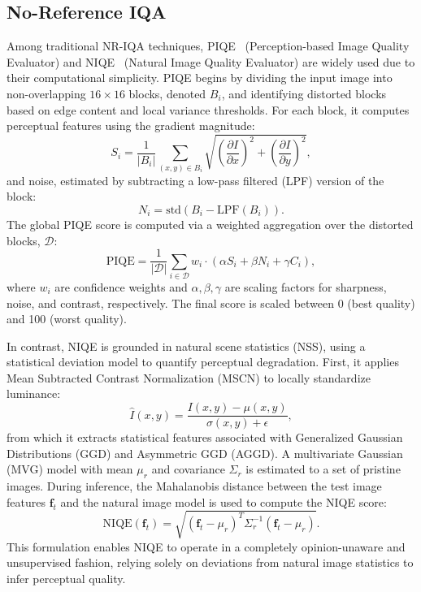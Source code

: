 \subsection{No-Reference IQA}\label{sec:no_reference_iqa}

Among traditional NR-IQA techniques, PIQE~\cite{piqe2016} (Perception-based Image Quality Evaluator) and NIQE~\cite{mittal2013making} (Natural Image Quality Evaluator) are widely used due to their computational simplicity. PIQE begins by dividing the input image into non-overlapping $16 \times 16$ blocks, denoted $B_i$, and identifying distorted blocks based on edge content and local variance thresholds. For each block, it computes perceptual features using the gradient magnitude:
\begin{equation}
S_i = \frac{1}{|B_i|} \sum_{(x,y) \in B_i} \sqrt{ {\left( \frac{\partial I}{\partial x} \right)}^2 + {\left( \frac{\partial I}{\partial y} \right)}^2 },
\end{equation}
and noise, estimated by subtracting a low-pass filtered (LPF) version of the block:
\begin{equation}
N_i = \text{std}\left( B_i - \text{LPF}(B_i) \right).
\end{equation}
The global PIQE score is computed via a weighted aggregation over the distorted blocks, $\mathcal{D}$:
\begin{equation}
\text{PIQE} = \frac{1}{|\mathcal{D}|} \sum_{i \in \mathcal{D}} w_i \cdot ( \alpha S_i + \beta N_i + \gamma C_i ),
\end{equation}
where $w_i$ are confidence weights and $\alpha, \beta, \gamma$ are scaling factors for sharpness, noise, and contrast, respectively. The final score is scaled between 0 (best quality) and 100 (worst quality).

In contrast, NIQE is grounded in natural scene statistics (NSS), using a statistical deviation model to quantify perceptual degradation. First, it applies Mean Subtracted Contrast Normalization (MSCN) to locally standardize luminance:
\begin{equation}
\hat{I}(x, y) = \frac{I(x, y) - \mu(x, y)}{\sigma(x, y) + \epsilon},
\end{equation}
from which it extracts statistical features associated with Generalized Gaussian Distributions (GGD) and Asymmetric GGD (AGGD). A multivariate Gaussian (MVG) model with mean $\mu_r$ and covariance $\Sigma_r$ is estimated to a set of pristine images. During inference, the Mahalanobis distance between the test image features $\mathbf{f}_t$ and the natural image model is used to compute the NIQE score:
\begin{equation}
\text{NIQE}(\mathbf{f}_t) = \sqrt{ {(\mathbf{f}_t - \mu_r)}^T \Sigma_r^{-1} (\mathbf{f}_t - \mu_r) }.
\end{equation}
This formulation enables NIQE to operate in a completely opinion-unaware and unsupervised fashion, relying solely on deviations from natural image statistics to infer perceptual quality.

